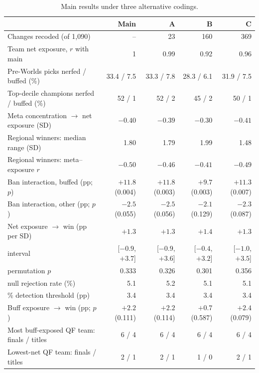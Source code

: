 \documentclass[11pt]{article}
\begin{document}
\begin{table}[h]
\centering
\small
\caption{Main results under three alternative codings.}
\label{tab:codingsens}
\setlength{\tabcolsep}{4pt}
\begin{tabular}{lrrrr}
\toprule
 & Main & A & B & C \\
\midrule
Changes recoded (of 1{,}090) & -- & 23 & 160 & 369 \\
Team net exposure, $r$ with main & 1 & 0.99 & 0.92 & 0.96 \\
Pre-Worlds picks nerfed / buffed (\%) & 33.4 / 7.5 & 33.3 / 7.8 & 28.3 / 6.1 & 31.9 / 7.5 \\
Top-decile champions nerfed / buffed (\%) & 52 / 1 & 52 / 2 & 45 / 2 & 50 / 1 \\
Meta concentration $\rightarrow$ net exposure (SD) & $-0.40$ & $-0.39$ & $-0.30$ & $-0.41$ \\
Regional winners: median range (SD) & 1.80 & 1.79 & 1.99 & 1.48 \\
Regional winners: meta--exposure $r$ & $-0.50$ & $-0.46$ & $-0.41$ & $-0.49$ \\
Ban interaction, buffed (pp; $p$) & $+11.8$ (0.004) & $+11.8$ (0.003) & $+9.7$ (0.003) & $+11.3$ (0.007) \\
Ban interaction, other (pp; $p$) & $-2.5$ (0.055) & $-2.5$ (0.056) & $-2.1$ (0.129) & $-2.3$ (0.087) \\
Net exposure $\rightarrow$ win (pp per SD) & $+1.3$ & $+1.3$ & $+1.4$ & $+1.3$ \\
\quad interval & [$-0.9$, $+3.7$] & [$-0.9$, $+3.6$] & [$-0.4$, $+3.2$] & [$-1.0$, $+3.5$] \\
\quad permutation $p$ & 0.333 & 0.326 & 0.301 & 0.356 \\
\quad null rejection rate (\%) & 5.1 & 5.2 & 5.1 & 5.1 \\
\quad 80\% detection threshold (pp) & 3.4 & 3.4 & 3.4 & 3.4 \\
Buff exposure $\rightarrow$ win (pp; $p$) & $+2.2$ (0.111) & $+2.2$ (0.114) & $+0.7$ (0.587) & $+2.4$ (0.079) \\
Most buff-exposed QF team: finals / titles & 6 / 4 & 6 / 4 & 6 / 4 & 6 / 4 \\
Lowest-net QF team: finals / titles & 2 / 1 & 2 / 1 & 1 / 0 & 2 / 1 \\
\bottomrule
\end{tabular}
\end{table}
\end{document}
